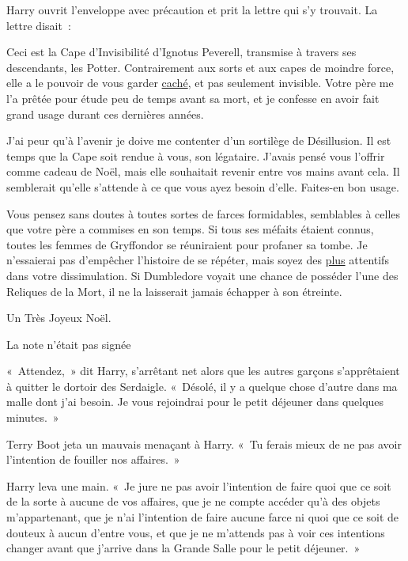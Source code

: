 Harry ouvrit l'enveloppe avec précaution et prit la lettre qui s'y trouvait. La lettre disait~:
\begin{writtenNote}

Ceci est la Cape d'Invisibilité d'Ignotus Peverell, transmise à travers ses descendants, les Potter. Contrairement aux sorts et aux capes de moindre force, elle a le pouvoir de vous garder \underline{caché}, et pas seulement invisible. Votre père me l'a prêtée pour étude peu de temps avant sa mort, et je confesse en avoir fait grand usage durant ces dernières années.

J'ai peur qu'à l'avenir je doive me contenter d'un sortilège de Désillusion. Il est temps que la Cape soit rendue à vous, son légataire. J'avais pensé vous l'offrir comme cadeau de Noël, mais elle souhaitait revenir entre vos mains avant cela. Il semblerait qu'elle s'attende à ce que vous ayez besoin d'elle. Faites-en bon usage.

Vous pensez sans doutes à toutes sortes de farces formidables, semblables à celles que votre père a commises en son temps. Si tous ses méfaits étaient connus, toutes les femmes de Gryffondor se réuniraient pour profaner sa tombe. Je n'essaierai pas d'empêcher l'histoire de se répéter, mais soyez des \underline{plus} attentifs dans votre dissimulation. Si Dumbledore voyait une chance de posséder l'une des Reliques de la Mort, il ne la laisserait jamais échapper à son étreinte.

Un Très Joyeux Noël.

\end{writtenNote}

La note n'était pas signée

\later

«~Attendez,~» dit Harry, s'arrêtant net alors que les autres garçons s'apprêtaient à quitter le dortoir des Serdaigle. «~Désolé, il y a quelque chose d'autre dans ma malle dont j'ai besoin. Je vous rejoindrai pour le petit déjeuner dans quelques minutes.~»

Terry Boot jeta un mauvais menaçant à Harry. «~Tu ferais mieux de ne pas avoir l'intention de fouiller nos affaires.~»

Harry leva une main. «~Je jure ne pas avoir l'intention de faire quoi que ce soit de la sorte à aucune de vos affaires, que je ne compte accéder qu'à des objets m'appartenant, que je n'ai l'intention de faire aucune farce ni quoi que ce soit de douteux à aucun d'entre vous, et que je ne m'attends pas à voir ces intentions changer avant que j'arrive dans la Grande Salle pour le petit déjeuner.~»

